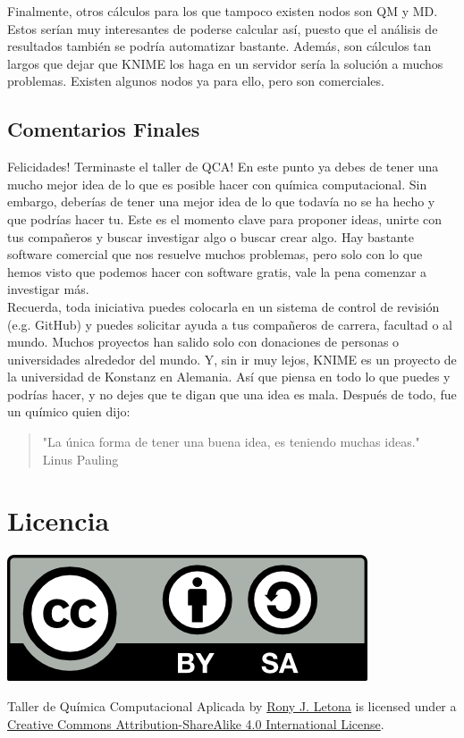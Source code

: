 \documentclass[10pt,letterpaper]{article}
\begin{document}
Finalmente, otros c\'alculos para los que tampoco existen nodos son QM y MD. Estos ser\'ian muy interesantes de poderse calcular as\'i, puesto que el an\'alisis de resultados tambi\'en se podr\'ia automatizar bastante. Adem\'as, son c\'alculos tan largos que dejar que KNIME los haga en un servidor ser\'ia la soluci\'on a muchos problemas. Existen algunos nodos ya para ello, pero son comerciales.

\subsection{Comentarios Finales}
Felicidades! Terminaste el taller de QCA! En este punto ya debes de tener una mucho mejor idea de lo que es posible hacer con qu\'imica computacional. Sin embargo, deber\'ias de tener una mejor idea de lo que todav\'ia no se ha hecho y que podr\'ias hacer tu. Este es el momento clave para proponer ideas, unirte con tus compa\~neros y buscar investigar algo o buscar crear algo. Hay bastante software comercial que nos resuelve muchos problemas, pero solo con lo que hemos visto que podemos hacer con software gratis, vale la pena comenzar a investigar m\'as.\\

Recuerda, toda iniciativa puedes colocarla en un sistema de control de revisi\'on (e.g. GitHub) y puedes solicitar ayuda a tus compa\~neros de carrera, facultad o al mundo. Muchos proyectos han salido solo con donaciones de personas o universidades alrededor del mundo. Y, sin ir muy lejos, KNIME es un proyecto de la universidad de Konstanz en Alemania. As\'i que piensa en todo lo que puedes y podr\'ias hacer, y no dejes que te digan que una idea es mala. Despu\'es de todo, fue un qu\'imico quien dijo:

\begin{flushright}
\begin{quote}
"La \'unica forma de tener una buena idea, es teniendo muchas ideas."\\
Linus Pauling
\end{quote}
\end{flushright}

\section*{Licencia}

\noindent \includegraphics{img/cc_big.png}

\noindent Taller de Qu\'imica Computacional Aplicada by \href{http://github.com/zronyj/TQCA}{Rony J. Letona} is licensed under a \href{http://creativecommons.org/licenses/by-sa/4.0/}{Creative Commons Attribution-ShareAlike 4.0 International License}.
\end{document}
